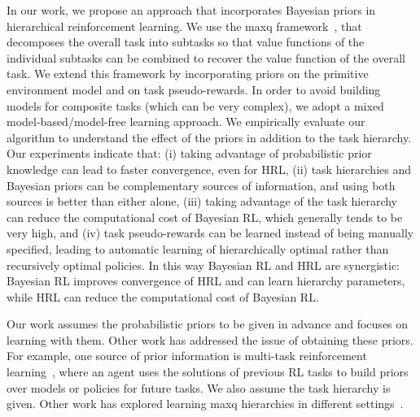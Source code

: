 In our work, we propose an approach that incorporates Bayesian priors
in hierarchical reinforcement learning. We use the {\sc maxq}
framework~\cite{d-hrl-00}, that decomposes the overall task
into subtasks so that value functions of the individual subtasks can
be combined to recover the value function of the overall task. We
extend this framework by incorporating priors on the primitive
environment model and on task pseudo-rewards. In order to avoid
building models for composite tasks (which can be very complex), we
adopt a mixed model-based/model-free learning approach.  We
empirically evaluate our algorithm to understand the effect of the
priors in addition to the task hierarchy. Our experiments indicate
that: (i) taking advantage of probabilistic prior knowledge can lead
to faster convergence, even for HRL, (ii) task hierarchies and
Bayesian priors can be complementary sources of information, and using
both sources is better than either alone, (iii) taking advantage of
the task hierarchy can reduce the computational cost of Bayesian RL,
which generally tends to be very high, and (iv) task pseudo-rewards
can be learned instead of being manually specified, leading to
automatic learning of hierarchically optimal rather than recursively
optimal policies. In this way Bayesian RL and HRL are synergistic:
Bayesian RL improves convergence of HRL and can learn hierarchy
parameters, while HRL can reduce the computational cost of Bayesian
RL.

Our work assumes the probabilistic priors to be given in advance and
focuses on learning with them. Other work has addressed the issue of
obtaining these priors. For example, one source of prior information
is multi-task reinforcement learning~\cite{Lazaric_bayesianmulti-task,
icml2007}, where an agent uses the solutions of previous RL tasks to
build priors over models or policies for future tasks. We also assume
the task hierarchy is given. Other work has explored learning {\sc
maxq} hierarchies in different settings~\cite{mehta.icml08}.
